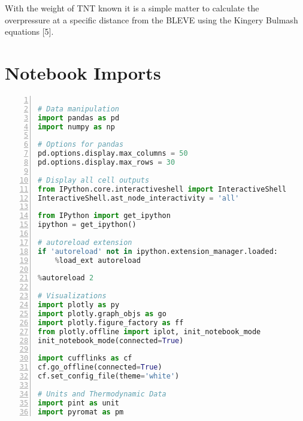 \documentclass[10pt,parskip=half,
toc=sectionentrywithdots,
bibliography=totocnumbered,
captions=tableheading,numbers=noendperiod]{scrartcl}
\begin{document}
With the weight of TNT known it is a simple matter to calculate the
overpressure at a specific distance from the BLEVE using the Kingery
Bulmash equations {[}5{]}.

\hypertarget{notebook-imports}{%
\section{Notebook Imports}\label{notebook-imports}}

\begin{lstlisting}[language=Python,numbers=left,xleftmargin=20pt,xrightmargin=5pt,belowskip=5pt,aboveskip=5pt]

# Data manipulation
import pandas as pd
import numpy as np

# Options for pandas
pd.options.display.max_columns = 50
pd.options.display.max_rows = 30

# Display all cell outputs
from IPython.core.interactiveshell import InteractiveShell
InteractiveShell.ast_node_interactivity = 'all'

from IPython import get_ipython
ipython = get_ipython()

# autoreload extension
if 'autoreload' not in ipython.extension_manager.loaded:
    %load_ext autoreload

%autoreload 2

# Visualizations
import plotly as py
import plotly.graph_objs as go
import plotly.figure_factory as ff
from plotly.offline import iplot, init_notebook_mode
init_notebook_mode(connected=True)

import cufflinks as cf
cf.go_offline(connected=True)
cf.set_config_file(theme='white')

# Units and Thermodynamic Data
import pint as unit
import pyromat as pm
\end{lstlisting}
\end{document}
